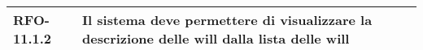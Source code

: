 \begin{center}
{\begin{longtable}{
        |>{\centering\arraybackslash}p{60pt}
        |>{\centering\arraybackslash}p{220pt}
        |>{\centering\arraybackslash}p{60pt}|}
        \hline
        
        
        RFO-11.1.2     & Il sistema deve permettere di visualizzare la descrizione delle \gls{will} dalla lista delle \gls{will} & \nameref{subsub:visualizzazione-will-descrizione}\\
        
        \hline                                                           
      \end{longtable}
      \renewcommand{\arraystretch}{1}
    }
  
  \end{center}